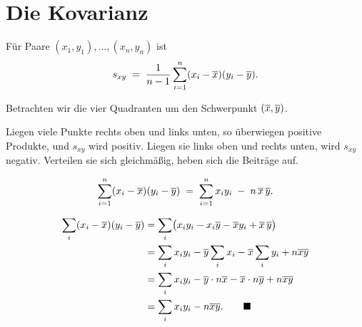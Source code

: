 \section{Die Kovarianz}

\begin{definition}
Für Paare $(x_1,y_1), \ldots, (x_n,y_n)$ ist
\[ s_{xy} \;=\; \frac{1}{n-1}\sum_{i=1}^n (x_i - \overline{x})(y_i - \overline{y}) . \]
\end{definition}

\begin{merksatz}
Betrachten wir die vier Quadranten um den Schwerpunkt $(\overline{x}, \overline{y})$.

\begin{center}
\end{center}

Liegen viele Punkte rechts oben und links unten, so überwiegen positive Produkte, und $s_{xy}$ wird positiv. Liegen sie links oben und rechts unten, wird $s_{xy}$ negativ. Verteilen sie sich gleichmäßig, heben sich die Beiträge auf.

\begin{center}
\begin{minipage}{0.88\textwidth}
\end{minipage}
\end{center}
\end{merksatz}

\begin{merksatz}
\[ \sum_{i=1}^n (x_i-\overline{x})(y_i-\overline{y}) \;=\; \sum_{i=1}^n x_i y_i \;-\; n\,\overline{x}\,\overline{y} . \]

\begin{align*}
\sum_i (x_i-\overline{x})(y_i-\overline y) &= \sum_i \bigl(x_iy_i - x_i\overline y - \overline{x} y_i + \overline{x}\,\overline y\bigr)\\
&= \sum_i x_iy_i - \overline y\sum_i x_i - \overline{x}\sum_i y_i + n\overline{x}\overline y\\
&= \sum_i x_iy_i - \overline y \cdot n\overline{x} - \overline{x} \cdot n\overline y + n\overline{x}\overline y\\
&= \sum_i x_iy_i - n\overline{x}\overline y . \qquad \blacksquare
\end{align*}
\end{merksatz}

